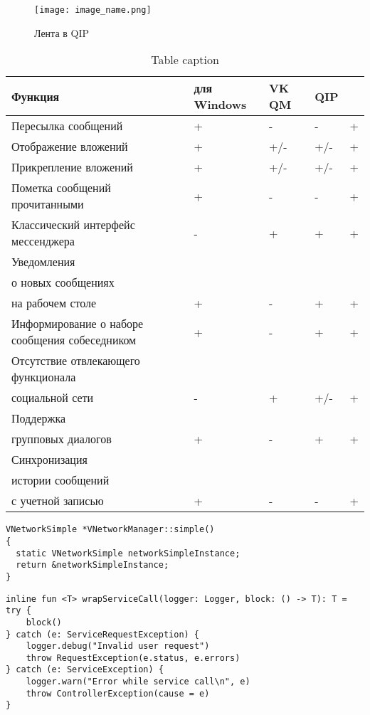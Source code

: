 \begin{figure}[hb!] \centering \texttt{[image: image\_name.png]}
  \caption{Лента в QIP}
  \label{fig:label_name}
\end{figure}

\begin{table}[h] \caption{Table caption}
\label{table:label_name}
\centering
     \begin{tabular}{ | >{\centering}m{} 
					  | >{\centering}m{} 
					  | >{\centering}m{} 
					  | >{\centering}m{}
					  | >{\centering\arraybackslash}m{}|}
	\hline Функция & \vk{} для Windows & VK QM & QIP & \textbf{\vkapp{}}\\
  	\hline Пересылка сообщений & + & - & - & +\\
  	\hline Отображение вложений & + & +/- & +/- & +\\
  	\hline Прикрепление вложений & + & +/- & +/- & +\\
  	\hline Пометка сообщений прочитанными & + & - & - & +\\
  	\hline Классический интерфейс мессенджера & - & + & + & +\\
  	\hline Уведомления \\ о новых сообщениях \\ на рабочем столе  & + & - & + &
  	+\\
  	\hline Информирование о наборе сообщения собеседником & + & - & + & +\\
  	\hline Отсутствие отвлекающего функционала \\ социальной сети & - & + & +/- &
  	+
  	\\
  	\hline Поддержка \\ групповых диалогов & + & - & + & + \\
  	\hline Синхронизация \\ истории сообщений \\ с учетной записью & + & - & - & +
  	\\
  	\hline
  \end{tabular}
\end{table}


\begin{lstlisting}[style = cstyle, 
           caption = {Получение экземпляра класса VNetworkSimple},
           label = lst:vnetworksimple] 
VNetworkSimple *VNetworkManager::simple()
{
  static VNetworkSimple networkSimpleInstance;
  return &networkSimpleInstance;
}
\end{lstlisting}


\begin{lstlisting}[style = ktstyle, 
           caption = {Пример функции на языке \kt{}},
           label = lst:load_page] 
inline fun <T> wrapServiceCall(logger: Logger, block: () -> T): T = try {
    block()
} catch (e: ServiceRequestException) {
    logger.debug("Invalid user request")
    throw RequestException(e.status, e.errors)
} catch (e: ServiceException) {
    logger.warn("Error while service call\n", e)
    throw ControllerException(cause = e)
}
\end{lstlisting}
